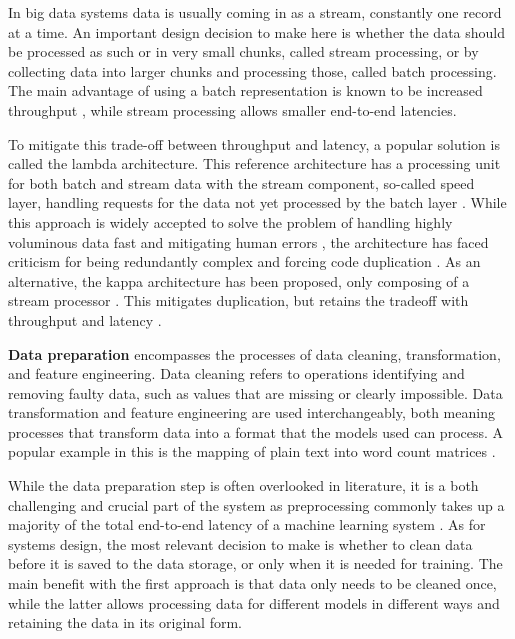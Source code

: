 In big data systems data is usually coming in as a stream, constantly one record at a time. An important design decision to make here is whether the data should be processed as such or in very small chunks, called stream processing, or by collecting data into  larger chunks and processing those, called batch processing. The main advantage of using a batch representation is known to be increased throughput%
, while stream processing allows smaller end-to-end latencies. %

To mitigate this trade-off between throughput and latency, a popular solution is called the lambda architecture. This reference architecture has a processing unit for both batch and stream data with the stream component, so-called speed layer, handling requests for the data not yet processed by the batch layer \cite{beatingcap}. While this approach is widely accepted to solve the problem of handling highly voluminous data fast and mitigating human errors \cite{lambdakappa}, the architecture has faced criticism for being redundantly complex and forcing code duplication \cite{questioninglambda} \cite{uber} \cite{facebook}. As an alternative, the kappa architecture has been proposed, only composing of a stream processor \cite{questioninglambda}. This mitigates duplication, but retains the tradeoff with throughput and latency \cite{lambdakappa}.

\textbf{Data preparation} encompasses the processes of data cleaning, transformation, and feature engineering. Data cleaning refers to operations identifying and removing faulty data, such as values that are missing or clearly impossible. Data transformation and feature engineering are used interchangeably, both meaning processes that transform data into a format that the models used can process. A popular example in this is the mapping of plain text into word count matrices \cite{dapbook}.

While the data preparation step is often overlooked in literature,
it is a both challenging and crucial part of the system as preprocessing commonly takes up a majority of the total end-to-end latency of a machine learning system \cite{adaptivelearningsystems}. As for systems design, the most relevant decision to make is whether to clean data before it is saved to the data storage, or only when it is  needed for training. The main benefit with the first approach is that data only needs to be cleaned once, while the latter allows processing data for different models in different ways and retaining the data in its original form.

